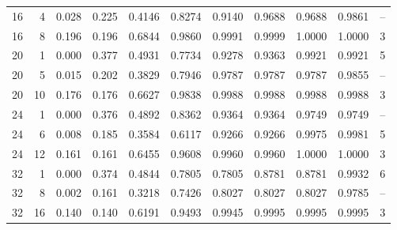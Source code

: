 \begin{table}[t]
\begin{tabular}{rrrrrrrrrrr}
16 & 4 & 0.028 & 0.225 & 0.4146 & 0.8274 & 0.9140 & 0.9688 & 0.9688 & 0.9861 & --\\
16 & 8 & 0.196 & 0.196 & 0.6844 & 0.9860 & 0.9991 & 0.9999 & 1.0000 & 1.0000 & 3\\
20 & 1 & 0.000 & 0.377 & 0.4931 & 0.7734 & 0.9278 & 0.9363 & 0.9921 & 0.9921 & 5\\
20 & 5 & 0.015 & 0.202 & 0.3829 & 0.7946 & 0.9787 & 0.9787 & 0.9787 & 0.9855 & --\\
20 & 10 & 0.176 & 0.176 & 0.6627 & 0.9838 & 0.9988 & 0.9988 & 0.9988 & 0.9988 & 3\\
24 & 1 & 0.000 & 0.376 & 0.4892 & 0.8362 & 0.9364 & 0.9364 & 0.9749 & 0.9749 & --\\
24 & 6 & 0.008 & 0.185 & 0.3584 & 0.6117 & 0.9266 & 0.9266 & 0.9975 & 0.9981 & 5\\
24 & 12 & 0.161 & 0.161 & 0.6455 & 0.9608 & 0.9960 & 0.9960 & 1.0000 & 1.0000 & 3\\
32 & 1 & 0.000 & 0.374 & 0.4844 & 0.7805 & 0.7805 & 0.8781 & 0.8781 & 0.9932 & 6\\
32 & 8 & 0.002 & 0.161 & 0.3218 & 0.7426 & 0.8027 & 0.8027 & 0.8027 & 0.9785 & --\\
32 & 16 & 0.140 & 0.140 & 0.6191 & 0.9493 & 0.9945 & 0.9995 & 0.9995 & 0.9995 & 3\\
\bottomrule\end{tabular}\end{table}
